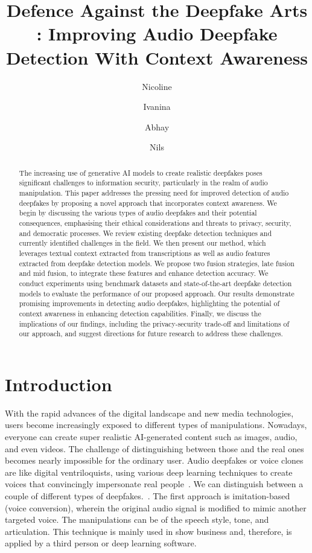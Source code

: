 \documentclass{Interspeech}
\title{Defence Against the Deepfake Arts : Improving Audio Deepfake Detection With Context Awareness}
\author[affiliation={1, 2*}]{Nicoline}{Nymand-Andersen}
\author[affiliation={1*}]{Ivanina}{Ivanova}
\author[affiliation={1*}]{Abhay}{Dayal Mathur}
\author[affiliation={1}]{Nils}{Holzenberger}
\affiliation{Telecom Paris}{Institut Polytechnique de Paris}{France}
\affiliation{Department of Computer Science}{Technische Universität München}{Germany}
\begin{document}
\maketitle

\begin{abstract}

  The increasing use of generative AI models to create realistic deepfakes poses significant challenges to information security, particularly in the realm of audio manipulation. This paper addresses the pressing need for improved detection of audio deepfakes by proposing a novel approach that incorporates context awareness. We begin by discussing the various types of audio deepfakes and their potential consequences, emphasising their ethical considerations and threats to privacy, security, and democratic processes. We review existing deepfake detection techniques and currently identified challenges in the field. We then present our method, which leverages textual context extracted from transcriptions as well as audio features extracted from deepfake detection models. We propose two fusion strategies, late fusion and mid fusion, to integrate these features and enhance detection accuracy. We conduct experiments using benchmark datasets and state-of-the-art deepfake detection models to evaluate the performance of our proposed approach. Our results demonstrate promising improvements in detecting audio deepfakes, highlighting the potential of context awareness in enhancing detection capabilities. Finally, we discuss the implications of our findings, including the privacy-security trade-off and limitations of our approach, and suggest directions for future research to address these challenges.
\end{abstract}

\section{Introduction}
\label{sec:introduction}

With the rapid advances of the digital landscape and new media technologies,
users become increasingly exposed to different types of manipulations.
Nowadays, everyone can create super realistic AI-generated content such as
images, audio, and even videos. The challenge of distinguishing between those
and the real ones becomes nearly impossible for the ordinary user. Audio
deepfakes or voice clones are like digital ventriloquists, using various deep
learning techniques to create voices that convincingly impersonate real
people~\cite{adversarial}. We can distinguish between a couple of different
types of deepfakes.~\cite{review_audio_deepfake_issues}. The first approach is
imitation-based (voice conversion), wherein the original audio signal is
modified to mimic another targeted voice. The manipulations can be of the
speech style, tone, and articulation. This technique is mainly used in show
business and, therefore, is applied by a third person or deep learning
software.
\end{document}
